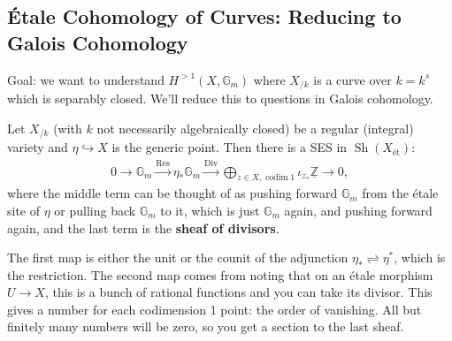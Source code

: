 \hypertarget{uxe9tale-cohomology-of-curves-reducing-to-galois-cohomology}{%
\subsection{Étale Cohomology of Curves: Reducing to Galois
Cohomology}\label{uxe9tale-cohomology-of-curves-reducing-to-galois-cohomology}}

Goal: we want to understand \(H^{>1}(X, {\mathbb{G}}_m)\) where
\(X_{/k}\) is a curve over \(k = k^{s}\) which is separably closed.
We'll reduce this to questions in Galois cohomology.

\begin{proposition}[?]

Let \(X_{/k}\) (with \(k\) not necessarily algebraically closed) be a
regular (integral) variety and \(\eta\hookrightarrow X\) is the generic
point. Then there is a SES in \({\operatorname{Sh}}(X_\text{ét})\):
\begin{align*}  
0 \to
{\mathbb{G}}_m
\xrightarrow{\operatorname{Res}}
\eta_* {\mathbb{G}}_m 
\xrightarrow{\operatorname{Div}}
\bigoplus_{z\in X, \operatorname{codim}1} \iota_{z_*} \underline{{\mathbb{Z}}}
\to 0
,\end{align*}
where the middle term can be thought of as pushing forward
\({\mathbb{G}}_m\) from the étale site of \(\eta\) or pulling back
\({\mathbb{G}}_m\) to it, which is just \({\mathbb{G}}_m\) again, and
pushing forward again, and the last term is the \textbf{sheaf of
divisors}.

\end{proposition}

\begin{remark}

The first map is either the unit or the counit of the adjunction
\(\eta_* \rightleftharpoons\eta^*\), which is the restriction. The
second map comes from noting that on an étale morphism \(U\to X\), this
is a bunch of rational functions and you can take its divisor. This
gives a number for each codimension 1 point: the order of vanishing. All
but finitely many numbers will be zero, so you get a section to the last
sheaf.

\end{remark}

